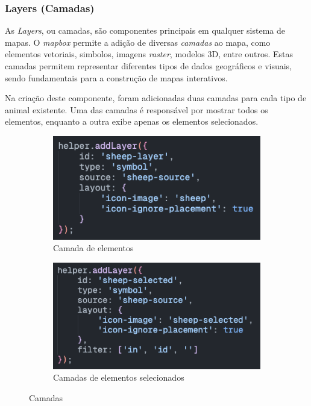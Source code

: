 \subsubsection{\textbf{Layers (Camadas)}}\label{sec:layers}
As \textit{Layers}, ou camadas, são componentes principais em qualquer sistema de mapas. O \textit{mapbox} permite a adição de diversas \textit{camadas} ao mapa, como elementos vetoriais, simbolos, imagens \textit{raster}, modelos 3D, entre outros. Estas camadas permitem representar diferentes tipos de dados geográficos e visuais, sendo fundamentais para a construção de mapas interativos.

Na criação deste componente, foram adicionadas duas camadas para cada tipo de animal existente. Uma das camadas é responsável por mostrar todos os elementos, enquanto a outra exibe apenas os elementos selecionados.

\begin{figure}[!h]
	\centering
	\begin{subfigure}[c]{0.40\textwidth}
		\centering
		\includegraphics[width=\textwidth]{figs/layer.png}
		\caption{Camada de elementos}
		\label{fig:layer}
	\end{subfigure}
	\hfill
	\begin{subfigure}[c]{0.40\textwidth}
		\centering
		\includegraphics[width=\textwidth]{figs/selected_layer.png}
		\caption{Camadas de elementos selecionados}
		\label{fig:selected_layer}
	\end{subfigure}
	\caption{Camadas}
    \label{fig:layers}
\end{figure}

